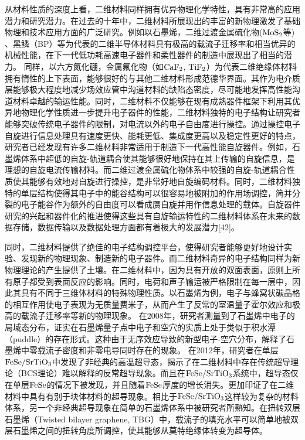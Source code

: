     从材料性质的深度上看，二维材料同样拥有优异物理化学特性，具有非常高的应用潜力和研究潜力。在过去的十年中，二维材料所展现出的丰富的新物理激发了基础物理和技术应用方面的广泛研究。例如以石墨烯，二维过渡金属硫化物($\rm{MoS_{2}}$等) 、黑鳞（BP）等为代表的二维半导体材料具有极高的载流子迁移率和相当优异的机械性能，在下一代低功耗高速电子器件和柔性器件的制造中展现出了相当的潜力。%
    同样，以六方氮化硼，金属氟化物（如$\rm{CaF_{2}}$, $\rm{TiF_{2}}$）为代表二维绝缘体材料拥有惰性的上下表面，能够很好的与其他二维材料形成范德华界面。其作为电介质层能够极大程度地减少场效应管中沟道材料的缺陷态密度，尽可能地发挥高性能沟道材料卓越的输运性能。同时，二维材料不仅能够在现有成熟器件框架下利用其优异地物理化学性质进一步提升电子器件的性能，二维材料独特的电子结构让研究者能够突破传统电子器件的限制，对电流以外的电子自由度进行操控。通过操控电子自旋进行信息处理具有速度更快、能耗更低、集成度更高以及稳定性更好的特点，研究者已经发现有许多二维材料非常适用于制造下一代高性能自旋器件。例如，石墨烯体系中超低的自旋-轨道耦合使其能够很好地保持在其上传输的自旋信息，是理想的自旋电流传输材料。而二维过渡金属硫化物体系中较强的自旋-轨道耦合性质使其能够有效地对自旋进行操控，是非常好地自旋编码材料。同时，二维材料独特的单层结构使得其电子中的能谷结构可以很容易地被附加的作用场调控，简并分裂的电子能谷作为额外的自由度可以看成赝自旋并用作信息处理的载体。自旋器件研究的兴起和器件化的推进使得这些具有自旋输运特性的二维材料体系在未来的数据存储，数据传输以及数据处理方面都有着极大的发展潜力[42]。%

    同时，二维材料提供了绝佳的电子结构调控平台，使得研究者能够更好地设计实验、发现新的物理现象、制造新的电子器件。而二维材料奇异的电子结构同样为新物理理论的产生提供了土壤。在二维材料中，因为具有开放的双面表面，原则上所有原子都受到表面反应的影响。同时，电荷和声子输运被严格限制在每一层中，因此其具有不同于三维体材料的特殊物理性质。以石墨烯为例，电子与蜂窝状碳晶格的相互作用使电子表现为无质量费米子，从而产生了反常的室温量子霍尔效应和极高的载流子迁移率等新的物理现象。%
    在2008年，研究者测量到了石墨烯中电子的局域态分布，证实在石墨烯量子点中电子和空穴的实质上处于类似于积水潭（puddle）的存在形式。这种由于无序效应导致的新型电子-空穴分布，解释了石墨烯中零载流子密度和非零电导同时存在的现象。%
    在2012年，研究者在单层$\rm{FeSe/SrTiO_{3}}$中发现了非经典的高温超导态，揭示了在二维材料中存在传统超导理论（BCS理论）难以解释的反常超导现象。而且在$\rm{FeSe/SrTiO_{3}}$系统中，超导态仅在单层$\rm{FeSe}$的情况下被发现，并且随着$\rm{FeSe}$厚度的增长消失。更加印证了在二维材料中具有有别于块体材料的超导现象。相比于$\rm{FeSe/SrTiO_{3}}$这样较为复杂的材料体系，另一个非经典超导现象在简单的石墨烯体系中被研究者所熟知。在扭转双层石墨烯（Twisted bilayer graphene, TBG）中，载流子的填充水平可以简单地被双层石墨烯之间的扭转角度所调控，使其能够从莫特绝缘体转变为超导体。

